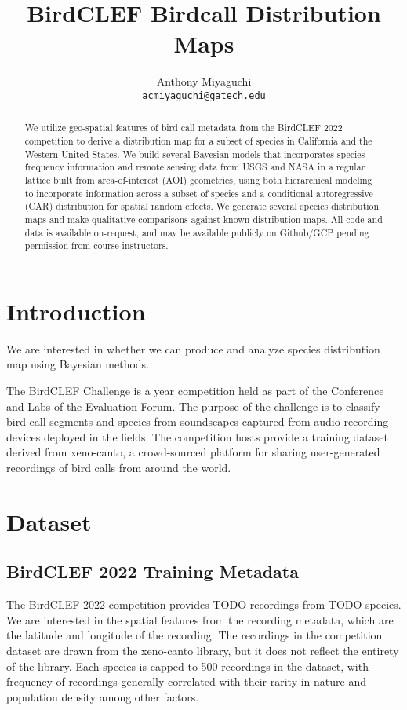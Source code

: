 \documentclass[notitlepage]{article}
\title{BirdCLEF Birdcall Distribution Maps}
\author{
    Anthony Miyaguchi \\  \texttt{acmiyaguchi@gatech.edu}
}
\begin{document}
\maketitle
\thispagestyle{empty}

\begin{abstract}

We utilize geo-spatial features of bird call metadata from the BirdCLEF 2022 competition to derive a distribution map for a subset of species in California and the Western United States.
We build several Bayesian models that incorporates species frequency information and remote sensing data from USGS and NASA in a regular lattice built from area-of-interest (AOI) geometries, using both hierarchical modeling to incorporate information across a subset of species and a conditional autoregressive (CAR) distribution for spatial random effects.
We generate several species distribution maps and make qualitative comparisons against known distribution maps.
All code and data is available on-request, and may be available publicly on Github/GCP pending permission from course instructors.

\end{abstract}

\section{Introduction}

We are interested in whether we can produce and analyze species distribution map using Bayesian methods.

The BirdCLEF Challenge is a year competition held as part of the Conference and Labs of the Evaluation Forum.
The purpose of the challenge is to classify bird call segments and species from soundscapes captured from audio recording devices deployed in the fields.
The competition hosts provide a training dataset derived from xeno-canto, a crowd-sourced platform for sharing user-generated recordings of bird calls from around the world.

\section{Dataset}
\subsection{BirdCLEF 2022 Training Metadata}

The BirdCLEF 2022 competition provides TODO recordings from TODO species.
We are interested in the spatial features from the recording metadata, which are the latitude and longitude of the recording.
The recordings in the competition dataset are drawn from the xeno-canto library, but it does not reflect the entirety of the library.
Each species is capped to 500 recordings in the dataset, with frequency of recordings generally correlated with their rarity in nature and population density among other factors.
\end{document}
